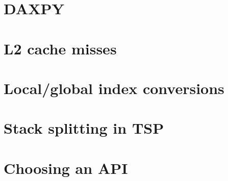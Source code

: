 \documentclass[a4paper,11pt,twoside]{article}
\begin{document}
\section{DAXPY}

\section{L2 cache misses}

\section{Local/global index conversions}

\section{Stack splitting in TSP}

\section{Choosing an API}




\end{document}
